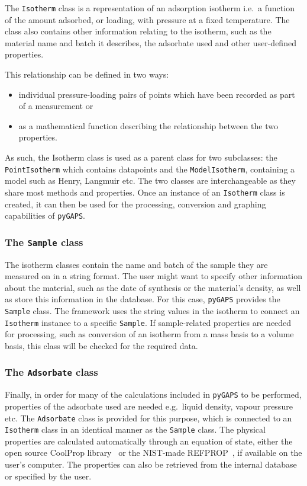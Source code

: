 The \texttt{Isotherm} class is a representation of an adsorption 
isotherm i.e.\ a function of the amount adsorbed, or loading, 
with pressure at a fixed temperature. The class also contains
other information relating to the isotherm, such as the material
name and batch it describes, the adsorbate used and other 
user-defined properties.

This relationship can be defined in two ways:

\begin{itemize}
    \item individual pressure-loading pairs of points which have 
    been recorded as part of a measurement or
    \item as a mathematical function describing the relationship 
    between the two properties. 
\end{itemize}

As such, the Isotherm class is used as a parent class for two subclasses: 
the \texttt{PointIsotherm} which contains datapoints and the
\texttt{ModelIsotherm}, containing a model such as Henry, Langmuir etc. 
The two classes are interchangeable 
as they share most methods and properties. Once an instance of 
an \texttt{Isotherm} class is created, it can then be used for the 
processing, conversion and graphing capabilities of \texttt{pyGAPS}.

\subsubsection{The \texttt{Sample} class}

The isotherm classes contain the name and batch of the sample 
they are measured on in a string format. The user might want to 
specify other information about the material,
such as the date of synthesis or the material's density,
as well as store this information in the database.
For this case, \texttt{pyGAPS} provides the \texttt{Sample} class.
The framework uses the string values
in the isotherm to connect an \texttt{Isotherm} instance to a 
specific \texttt{Sample}. If sample-related properties are 
needed for processing, such as conversion of an isotherm
from a mass basis to a volume basis, this class will be 
checked for the required data.

\subsubsection{The \texttt{Adsorbate} class}

Finally, in order for many of the calculations included in 
\texttt{pyGAPS} to be performed, properties of the adsorbate 
used are needed e.g.\ liquid density, vapour pressure etc.
The \texttt{Adsorbate} class is provided for this purpose,
which is connected to an \texttt{Isotherm} class in an identical manner 
as the \texttt{Sample} class. The physical properties are calculated 
automatically through an equation of state,
either the open source CoolProp library~\cite{bellPurePseudopureFluid2014} 
or the NIST-made REFPROP~\cite{lemmonNISTReferenceFluid1989}, if available
on the user's computer. The properties can also be retrieved 
from the internal database or specified by the user.

